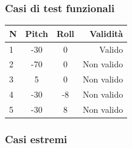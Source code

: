 \documentclass[a4paper,11pt]{article}
\begin{document}
\subsubsection{Casi di test funzionali}
\begin{tabular}{  l|*{2}{c}|r  }
N & Pitch & Roll & Validità\\
\hline
1 & -30 & 0 & Valido\\
2 & -70 & 0 & Non valido\\
3 & 5 & 0 & Non valido\\
4 & -30 & -8 & Non valido\\
5 & -30 & 8 & Non valido\\
\end{tabular}
\subsubsection{Casi estremi}
\end{document}
